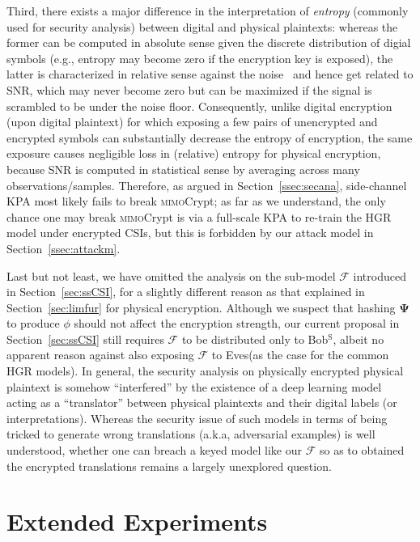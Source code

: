 \documentclass[conference,compsoc]{IEEEtran}
\newcommand{\name}{\textsc{mimo}Crypt\xspace}
\begin{document}
{Third, there exists a major difference in the interpretation of \textit{entropy} (commonly used for security analysis) between digital and physical plaintexts: whereas the former can be computed in absolute sense given the discrete distribution of digial symbols (e.g., entropy may become zero if the encryption key is exposed), the latter is characterized in relative sense against the noise~\cite{SIG-018} and hence get related to SNR, which may never become zero but can be maximized if the signal is scrambled to be under the noise floor. Consequently, unlike digital encryption (upon digital plaintext) for which exposing a few pairs of unencrypted and encrypted symbols can substantially decrease the entropy of encryption, the same exposure causes negligible loss in (relative) entropy for physical encryption, because SNR is computed in statistical sense by averaging across many observations/samples. Therefore, as argued in Section~\ref{ssec:secana}, side-channel KPA most likely fails to break \name; as far as we understand, the only chance one may break \name is via a full-scale KPA to re-train the HGR model under encrypted CSIs, but this is forbidden by our attack model in Section~\ref{ssec:attackm}.

Last but not least, we have omitted the analysis on the sub-model $\mathcal{F}$ introduced in Section~\ref{sec:ssCSI}, for a slightly different reason as that explained in Section~\ref{sec:limfur} for physical encryption. Although we suspect that hashing $\bm{\Psi}$ to produce $\phi$ should not affect the encryption strength, our current proposal in Section~\ref{sec:ssCSI} still requires $\mathcal{F}$ to be distributed only to Bob$^{\mathrm{S}}$, albeit no apparent reason against also exposing $\mathcal{F}$ to Eves(as the case for the common HGR models). In general, the security analysis on physically encrypted physical plaintext is somehow ``interfered'' by the existence of a deep learning model acting as a ``translator'' between physical plaintexts and their digital labels (or interpretations). Whereas the security issue of such models in terms of being tricked to generate wrong translations (a.k.a, adversarial examples) is well understood, whether one can breach a keyed model like our $\mathcal{F}$ so as to obtained the encrypted translations remains a largely unexplored question.
}


\section{Extended Experiments}
\end{document}
